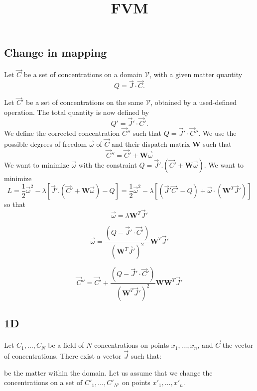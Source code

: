 \documentclass[aps,onecolumn,11pt]{revtex4}
\begin{document}
\title{FVM}
\maketitle

\subsection{Change in mapping}
Let $\vec{C}$ be a set of concentrations on a domain $\mathcal{V}$,
with a given matter quantity 
$$Q=\vec{J}\cdot\vec{C}.$$

Let $\vec{C}'$ be a set of concentrations on the same $\mathcal{V}$, obtained by
a used-defined operation. The total quantity is now
defined by 
$$Q'=\vec{J}' \cdot \vec{C}'.$$
We define the corrected concentration $\vec{C}''$ such that $Q=\vec{J}'\cdot\vec{C}''$.
We use the possible degrees of freedom $\vec{\omega}$ of $\vec{C}$ and their dispatch matrix
$\bm{W}$ such that
$$
	\vec{C}'' = \vec{C}' + \bm{W} \vec{\omega}
$$
We want to minimize $\vec{\omega}$ with the constraint $Q=\vec{J}' . \left( \vec{C}' + \bm{W} \vec{\omega}\right)$.
We want to minimize
$$
	L = \dfrac{1}{2} \vec{\omega}^2 - \lambda\left[ \vec{J}' . \left( \vec{C}' + \bm{W} \vec{\omega}\right) - Q \right]
	= \dfrac{1}{2} \vec{\omega}^2 - \lambda\left[ \left(\vec{J}' \vec{C}' - Q\right) + \vec{\omega} \cdot \left( \bm{W}^T \vec{J}'\right)\right]
$$
so that
$$
	\vec{\omega} = \lambda \bm{W}^T \vec{J}'
$$

$$
	\vec{\omega} = \dfrac{\left( Q - \vec{J}' \cdot \vec{C}' \right)}{(\bm{W}^T \vec{J}')^2} \bm{W}^T \vec{J}'
$$

$$
	\vec{C}'' = \vec{C}' + \dfrac{\left( Q - \vec{J}' \cdot \vec{C}' \right)}{(\bm{W}^T \vec{J}')^2} \bm{W}\bm{W}^T \vec{J}'
$$


\subsection{1D}

\noindent Let $C_1,\ldots,C_N$ be a field of $N$ concentrations on points $x_1,\ldots,x_n$, and $\vec{C}$ the vector of concentrations.
There exist a vector $\vec{J}$ such that:
 	
be the matter within the domain.
Let us assume that we change the concentrations on a set of $C'_1,\ldots,C'_{N'}$ on points $x'_1,\ldots,x'_n$.
\end{document}
